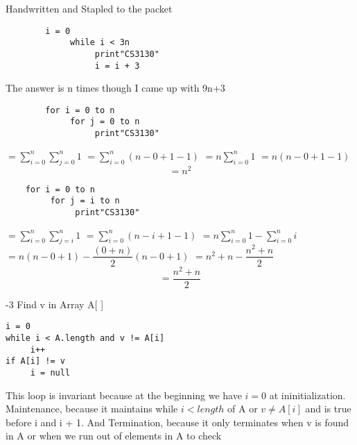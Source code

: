 \documentclass[12pt,largemargins]{homework}
\begin{document}
\question
	Handwritten and Stapled to the packet
\question
	\begin{alphaparts}
	\item
	\begin{verbatim}
		i = 0
		     while i < 3n
		          print"CS3130"
		          i = i + 3
	\end{verbatim}
		The answer is n times though I came up with 9n+3
	\item
		\begin{verbatim}
		for i = 0 to n
		     for j = 0 to n 
		          print"CS3130"
		\end{verbatim}
		$=\sum_{i=0}^{n} \sum_{j=0}^{n} 1$
		$=\sum_{i=0}^{n} (n-0+1-1)$
		$=n\sum_{i=0}^{n} 1 $
		$=n(n-0+1-1)$
		$$=n^2$$

\newpage
	\item
	\begin{verbatim}
	for i = 0 to n 
	     for j = i to n
	          print"CS3130"
	\end{verbatim}
	$=\sum_{i=0}^{n} \sum_{j=i}^{n} 1$
	$=\sum_{i=0}^{n} (n-i+1-1)$
	$=n\sum_{i=0}^{n} 1 - \sum_{i=0}^{n} i$\\
	$=n(n-0+1) - \dfrac{(0 + n)}{2} (n - 0 + 1)$
	$=n^2 + n - \dfrac{n^2 + n}{2}$ \\
	$$=\dfrac{n^2 + n}{2}$$

	\end{alphaparts}
	
-3
Find v in Array A[ ]

\begin{verbatim}
i = 0
while i < A.length and v != A[i]
     i++
if A[i] != v
     i = null
\end{verbatim}
This loop is invariant because at the beginning we have $i = 0$ at ininitialization. Maintenance, because it maintains while $i < length$ of A or $v \neq A[i]$ and is true before i and i + 1. And Termination, because it only terminates when v is found in A or when we run out of elements in A to check
\end{document}
